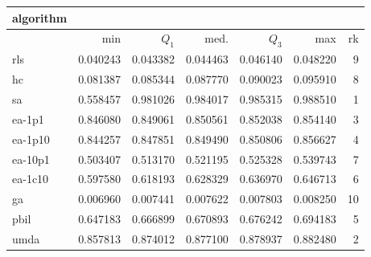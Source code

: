 \begin{tabular}{@{}l*{5}{>{{}}N{1}{3}}>{{}}N{2}{0}@{}}
\toprule
{algorithm} &  \\
\midrule
& {min} & {$Q_1$} & {med.} & {$Q_3$} & {max} & {rk}\\
\midrule
rls & 0.040243 & 0.043382 & 0.044463 & 0.046140 & 0.048220 & 9\\
hc & 0.081387 & 0.085344 & 0.087770 & 0.090023 & 0.095910 & 8\\
sa & 0.558457 & {\color{blue}} 0.981026 & {\color{blue}} 0.984017 & {\color{blue}} 0.985315 & {\color{blue}} 0.988510 & 1\\
ea-1p1 & 0.846080 & 0.849061 & 0.850561 & 0.852038 & 0.854140 & 3\\
ea-1p10 & 0.844257 & 0.847851 & 0.849490 & 0.850806 & 0.856627 & 4\\
ea-10p1 & 0.503407 & 0.513170 & 0.521195 & 0.525328 & 0.539743 & 7\\
ea-1c10 & 0.597580 & 0.618193 & 0.628329 & 0.636970 & 0.646713 & 6\\
ga & 0.006960 & 0.007441 & 0.007622 & 0.007803 & 0.008250 & 10\\
pbil & 0.647183 & 0.666899 & 0.670893 & 0.676242 & 0.694183 & 5\\
umda & {\color{blue}} 0.857813 & 0.874012 & 0.877100 & 0.878937 & 0.882480 & 2\\
\bottomrule
\end{tabular}
